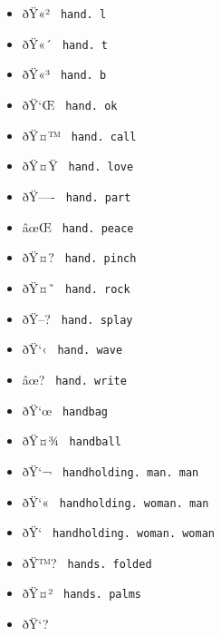 \begin{itemize}
\item
  \label{symbol-hand.l}{{ ðŸ«² } \texttt{\ hand.\ l\ }}
\item
  \label{symbol-hand.t}{{ ðŸ«´ } \texttt{\ hand.\ t\ }}
\item
  \label{symbol-hand.b}{{ ðŸ«³ } \texttt{\ hand.\ b\ }}
\item
  \label{symbol-hand.ok}{{ ðŸ`Œ } \texttt{\ hand.\ ok\ }}
\item
  \label{symbol-hand.call}{{ ðŸ¤™ }
  \texttt{\ hand.\ call\ }}
\item
  \label{symbol-hand.love}{{ ðŸ¤Ÿ }
  \texttt{\ hand.\ love\ }}
\item
  \label{symbol-hand.part}{{ ðŸ---- }
  \texttt{\ hand.\ part\ }}
\item
  \label{symbol-hand.peace}{{ âœŒ }
  \texttt{\ hand.\ peace\ }}
\item
  \label{symbol-hand.pinch}{{ ðŸ¤? }
  \texttt{\ hand.\ pinch\ }}
\item
  \label{symbol-hand.rock}{{ ðŸ¤˜ }
  \texttt{\ hand.\ rock\ }}
\item
  \label{symbol-hand.splay}{{ ðŸ--? }
  \texttt{\ hand.\ splay\ }}
\item
  \label{symbol-hand.wave}{{ ðŸ`‹ }
  \texttt{\ hand.\ wave\ }}
\item
  \label{symbol-hand.write}{{ âœ? }
  \texttt{\ hand.\ write\ }}
\item
  \label{symbol-handbag}{{ ðŸ`œ } \texttt{\ handbag\ }}
\item
  \label{symbol-handball}{{ ðŸ¤¾ } \texttt{\ handball\ }}
\item
  \label{symbol-handholding.man.man}{{ ðŸ`¬ }
  \texttt{\ handholding.\ man.\ man\ }}
\item
  \label{symbol-handholding.woman.man}{{ ðŸ`« }
  \texttt{\ handholding.\ woman.\ man\ }}
\item
  \label{symbol-handholding.woman.woman}{{ ðŸ`­ }
  \texttt{\ handholding.\ woman.\ woman\ }}
\item
  \label{symbol-hands.folded}{{ ðŸ™? }
  \texttt{\ hands.\ folded\ }}
\item
  \label{symbol-hands.palms}{{ ðŸ¤² }
  \texttt{\ hands.\ palms\ }}
\item
  \label{symbol-hands.clap}{{ ðŸ`? }
}
\end{itemize}

